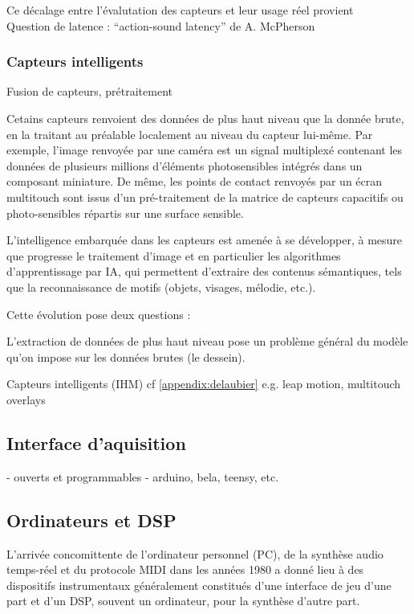 Ce décalage entre l'évalutation des capteurs et leur usage réel provient \\


Question de latence : ``action-sound latency'' de A. McPherson

\subsubsection{Capteurs intelligents}

Fusion de capteurs, prétraitement

\noindent Cetains capteurs renvoient des données de plus haut niveau que la donnée brute, en la traitant au préalable localement au niveau du capteur lui-même. Par exemple, l'image renvoyée par une caméra est un signal multiplexé contenant les données de plusieurs millions d'éléments photosensibles intégrés dans un composant miniature. 
De même, les points de contact renvoyés par un écran multitouch sont issus d'un pré-traitement de la matrice de capteurs capacitifs ou photo-sensibles répartis sur une surface sensible.

\indent L'intelligence embarquée dans les capteurs est amenée à se développer, à mesure que progresse le traitement d'image et en particulier les algorithmes d'apprentissage par \gls{IA}, qui permettent d'extraire des contenus sémantiques, tels que la reconnaissance de motifs (objets, visages, mélodie, etc.).

\indent Cette évolution pose deux questions : 

L'extraction de données de plus haut niveau pose un problème général du modèle qu'on impose sur les données brutes (le dessein).


	Capteurs intelligents (IHM)
	cf \ref{appendix:delaubier}
	e.g. leap motion, multitouch overlays

\subsection{Interface d'aquisition}
	- ouverts et programmables
		- arduino, bela, teensy, etc.

\subsection{Ordinateurs et DSP}
\noindent L'arrivée concomittente de l'ordinateur personnel (PC), de la synthèse audio temps-réel et du protocole \gls{MIDI} dans les années 1980 a donné lieu à des dispositifs instrumentaux généralement constitués d'une interface de jeu d'une part et d'un \gls{DSP}, souvent un ordinateur, pour la synthèse d'autre part.

